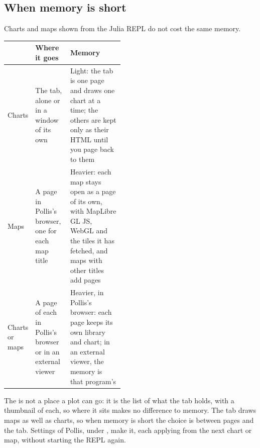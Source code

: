 \subsection{When memory is short}\label{sec:memory}
Charts and maps shown from the Julia REPL do not cost the same memory.
\begin{center}\small
\renewcommand{\arraystretch}{1.25}
\begin{tabularx}{\linewidth}{@{}p{0.16\linewidth}p{0.3\linewidth}L@{}}
\toprule
& \textbf{Where it goes} & \textbf{Memory}\\
\midrule
Charts & The  tab, alone or in a window of its own & Light: the tab is one page and draws one chart at a time; the others are kept only as
  their HTML until you page back to them\\
Maps & A page in Pollis's browser, one for each map title & Heavier: each map stays open as a page of its own, with
  MapLibre GL JS, WebGL and the tiles it has fetched, and maps with other titles add pages\\
Charts or maps & A page of each in Pollis's browser or in an external viewer & Heavier, in Pollis's browser: each
  page keeps its own library and chart; in an external viewer, the memory is that program's\\
\bottomrule
\end{tabularx}
\end{center}
The  is not a place a plot can go: it is the list of what the  tab holds, with a
thumbnail of each, so where it sits makes no difference to memory. The  tab draws maps as well as charts, so
when memory is short the choice is between pages and the  tab. Settings of Pollis, under , make
it, each applying from the next chart or map, without starting the REPL again.
